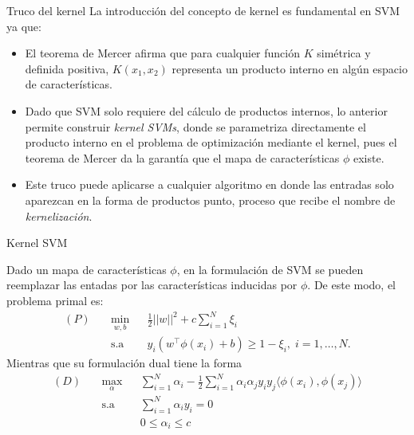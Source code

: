 \documentclass[9pt, handout]{beamer}
\begin{document}
\begin{frame}{Truco del kernel}
	La introducción del concepto de kernel es fundamental en SVM ya que:
	
	\begin{itemize}
		\item El teorema de Mercer afirma que para cualquier función $K$ simétrica y definida positiva, $K(x_1,x_2)$ representa un producto interno en algún espacio de características.\pause
		\item  Dado que SVM solo requiere del cálculo de productos internos, lo anterior permite construir \emph{kernel SVMs}, donde se parametriza directamente el producto interno en el problema de optimización mediante el kernel, pues el teorema de Mercer da la garantía que el mapa de características $\phi$ existe.\pause
		\item Este truco puede aplicarse a cualquier algoritmo en donde las entradas solo aparezcan en la forma de productos punto, proceso que recibe el nombre de \emph{kernelización}. 
	\end{itemize}
	 
\end{frame}

\begin{frame}{Kernel SVM}

Dado un mapa de características $\phi$, en la formulación de SVM se pueden reemplazar las entadas por las características inducidas por $\phi$. De este modo, el problema primal es:
\begin{equation*}
\begin{aligned}
(P)\quad & \underset{w,b}{\text{min}}
& & \frac{1}{2}||w||^2 + c\sum\limits_{i=1}^{N} \xi_i\\
& \text{s.a}
& & y_i (w^\top \phi(x_i) +b) \geq 1- \xi_i, \; i = 1, \ldots, N.
\end{aligned}
\end{equation*}\pause
Mientras que su formulación dual tiene la forma
\begin{equation*}
\begin{aligned}
(D)\quad & \underset{\alpha}{\text{max}}
& & \sum\limits_{i=1}^{N}\alpha_i - \frac{1}{2} \sum\limits_{i=1}^{N} \alpha_i \alpha_j y_i y_j \langle\phi(x_i), \phi(x_j)\rangle\\
& \text{s.a}
& & \sum\limits_{i=1}^{N} \alpha_i y_i= 0 \\
& &  &0 \leq \alpha_i \leq c
\end{aligned}
\end{equation*}


\end{frame}
\end{document}
